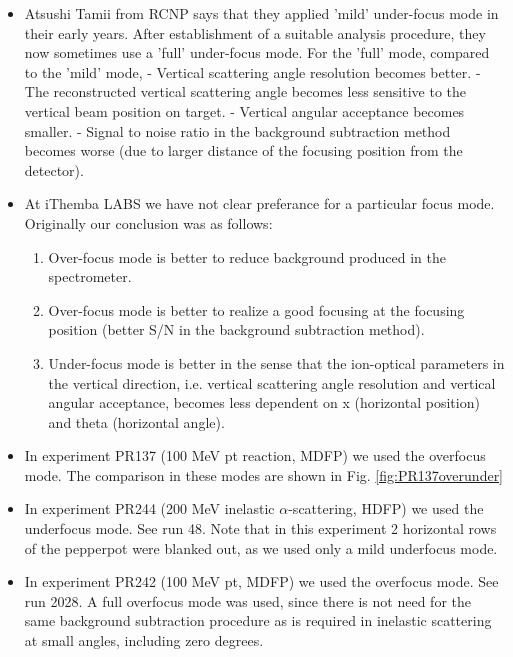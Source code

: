 \documentclass[11pt]{report}
\begin{document}
\begin{itemize}
\item Atsushi Tamii from RCNP says that they applied 'mild' under-focus mode in their
 early years.
 After establishment of a suitable analysis procedure, they now sometimes use a
 'full' under-focus mode.
 For the 'full' mode, compared to the 'mild' mode,
     - Vertical scattering angle resolution becomes better.
     - The reconstructed vertical scattering angle becomes less sensitive
       to the vertical beam position on target.
     - Vertical angular acceptance becomes smaller.
     - Signal to noise ratio in the background subtraction method becomes
       worse (due to larger distance of the focusing position from the
       detector).

\item At iThemba LABS we have not clear preferance for a particular focus mode.
Originally our conclusion was as follows:
	\begin{enumerate}
	\item Over-focus mode is better to reduce background produced in the spectrometer.
	\item Over-focus mode is better to realize a good focusing at the focusing position (better S/N in the background subtraction method).
	\item Under-focus mode is better in the sense that the ion-optical parameters in the vertical direction, i.e. vertical scattering angle resolution and vertical angular acceptance, becomes less dependent on x (horizontal position) and theta (horizontal angle).
	\end{enumerate}

\item In experiment PR137 (100 MeV pt reaction, MDFP) we used the overfocus mode. The comparison in these modes are shown
in Fig. \ref{fig:PR137overunder}

\item In experiment PR244 (200 MeV inelastic $\alpha$-scattering, HDFP) we used the underfocus mode. See run 48.  Note that in this experiment 2 horizontal rows of the pepperpot 
were blanked out, as we used only a mild underfocus mode.

\item In experiment PR242 (100 MeV pt, MDFP) we used the overfocus mode. See run 2028.
A full overfocus mode was used, since there is not need for the same background
subtraction procedure as is required in inelastic scattering at small angles, including zero degrees.


\end{itemize}
\end{document}
